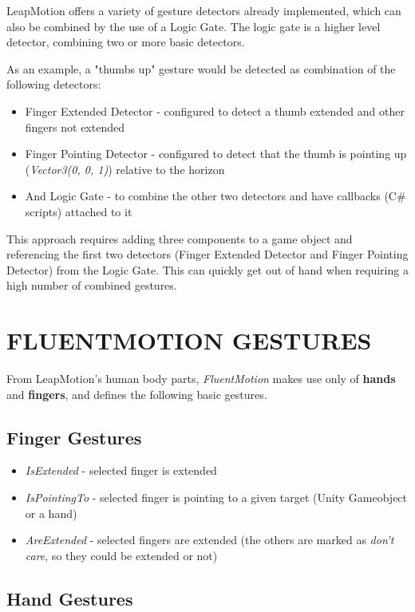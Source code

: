 \documentclass{sigchi}
\def\fluentmotion{\textit{FluentMotion}}
\def\leap{LeapMotion}
\begin{document}
\leap{} offers a variety of gesture detectors already implemented, which can also be combined by the use of a Logic Gate. The logic gate is a higher level detector, combining two or more basic detectors.


As an example, a "thumbs up" gesture would be detected as combination of the following detectors:

\begin{itemize}
  \item Finger Extended Detector - configured to detect a thumb extended and other fingers not extended
  \item Finger Pointing Detector - configured to detect that the thumb is pointing up (\textit{Vector3(0, 0, 1)}) relative to the horizon
  \item And Logic Gate - to combine the other two detectors and have callbacks (C\# scripts) attached to it
\end{itemize}

This approach requires adding three components to a game object and referencing the first two detectors (Finger Extended Detector and Finger Pointing Detector) from the Logic Gate. This can quickly get out of hand when requiring a high number of combined gestures.

\section{FLUENTMOTION GESTURES}

From \leap{}'s human body parts, \fluentmotion{} makes use only of \textbf{hands} and \textbf{fingers}, and defines the following basic gestures.

\subsection{Finger Gestures}
\begin{itemize}
  \item \textit{IsExtended} - selected finger is extended
  \item \textit{IsPointingTo} - selected finger is pointing to a given target (Unity Gameobject or a hand)
  \item \textit{AreExtended} - selected fingers are extended (the others are marked as \textit{don't care}, so they could be extended or not)
\end{itemize}

\subsection{Hand Gestures}
\end{document}
